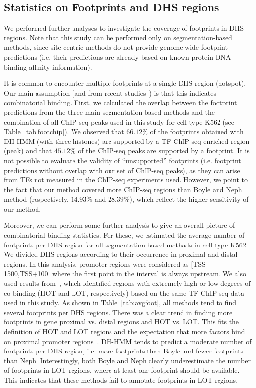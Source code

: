 \documentclass{bioinfo}
\begin{document}
{\color{black}
\subsection{Statistics on Footprints and DHS regions}
\label{sec:stats.fp.dhs}

We performed further analyses to investigate the coverage of footprints
in DHS regions. Note that this study can be performed only on segmentation-based
methods, since site-centric methods do not provide genome-wide footprint
predictions (i.e. their predictions are already based on known protein-DNA
binding affinity information).

It is common to encounter multiple footprints at a single DHS region (hotspot).
Our main assumption (and from recent studies~\citep{neph2012a,jankowski2013,boyle2011})
is that this indicates combinatorial binding. First, we calculated the overlap
between the footprint predictions from the three main segmentation-based methods
and the combination of all ChIP-seq peaks used in this study for cell type K562
(see Table~\ref{tab:footchip}). We observed that $66.12\%$ of the footprints obtained
with DH-HMM (with three histones) are supported by a TF ChIP-seq enriched region
(peak) and that $45.12\%$ of the ChIP-seq peaks are supported by a footprint. It is
not possible to evaluate the validity of ``unsupported'' footprints (i.e. footprint
predictions without overlap with our set of ChIP-seq peaks), as they can arise from
TFs not measured in the ChIP-seq experiments used. However, we point to the fact that
our method covered more ChIP-seq regions than Boyle and Neph method (respectively,
$14.93\%$ and $28.39\%$), which reflect the higher sensitivity of our method.

Moreover, we can perform some further analysis to give an overall picture of combinatorial
binding statistics. For these, we estimated the average number of footprints per DHS region
for all segmentation-based methods in cell type K562. We divided DHS regions according to
their occurrence in proximal and distal regions. In this analysis, promoter regions were
considered as [TSS-1500,TSS+100] where the first point in the interval is always upstream.
We also used results from~\cite{yip2012}, which identified regions with extremely high or
low degrees of co-binding (HOT and LOT, respectively) based on the same TF ChIP-seq data
used in this study. As shown in Table~\ref{tab:avgfoot}, all methods tend to find several
footprints per DHS regions. There was a clear trend in finding more footprints in gene proximal
vs. distal regions and HOT vs. LOT. This fits the definition of HOT and LOT regions and the
expectation that more factors bind on proximal promoter regions~\cite{yip2012}. DH-HMM
tends to predict a moderate number of footprints per DHS region, i.e. more footprints than
Boyle and fewer footprints than Neph. Interestingly, both Boyle and Neph clearly underestimate
the number of footprints in LOT regions, where at least one footprint should be available.
This indicates that these methods fail to annotate footprints in LOT regions.

}
\end{document}
